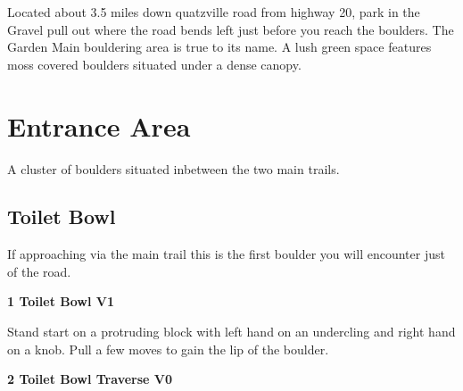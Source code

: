 \begin{multicols}{2}

\begin{minipage}{\columnwidth}
Located about 3.5 miles down quatzville road from highway 20, park in the Gravel pull out where the road bends left just before you reach the boulders. The Garden Main bouldering area is true to its name. A lush green space features moss covered boulders situated under a dense canopy.
\end{minipage}

\newpage
		\section{Entrance Area}\label{sa:Entrance Area}
	\begin{minipage}{\columnwidth}
	A cluster of boulders situated inbetween the two main trails.
	\end{minipage}

			\subsection*{Toilet Bowl}\label{bf:Toilet Bowl}
			\begin{minipage}{\columnwidth}
			If approaching via the main trail this is the first boulder you will encounter just of the road.
			\end{minipage}
			

					\begin{minipage}{\linewidth}	
					\label{rt:Toilet Bowl}
\colorbox{green!20}{
\parbox{0.95\textwidth}{
\textbf{
1 Toilet Bowl V1   
}
}
}

					\begin{adjustwidth}{0.5cm}{}				
					Stand start on a protruding block with left hand on an undercling and right hand on a knob. Pull a few moves to gain the lip of the boulder.
					\end{adjustwidth}
					\end{minipage}
					\begin{minipage}{\linewidth}	
					\label{rt:Toilet Bowl Traverse}
\colorbox{green!20}{
\parbox{0.95\textwidth}{
\textbf{
2 Toilet Bowl Traverse V0    
}
}
}


\end{minipage}
\end{multicols}
